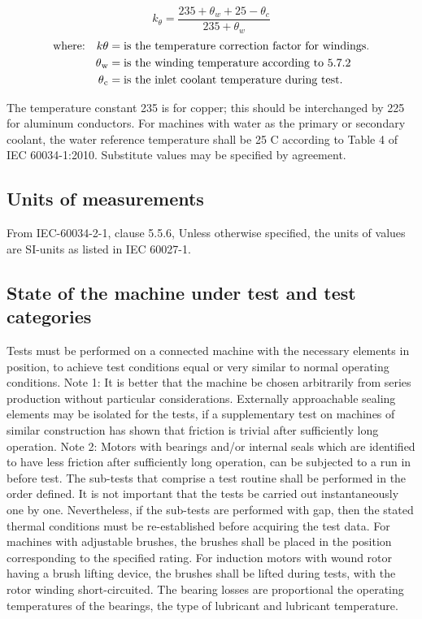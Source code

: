 \begin{equation}
k_{\theta}=\frac{235+\theta_{w}+25-\theta_{c}}{235+\theta_{w}}
\end{equation}
\begin{align*}
\text{where:}\quad
 k\theta    &=  \text{is the temperature correction factor for windings.} \\
 \theta\textsubscript{w}     &=  \text{is the winding temperature according to 5.7.2} 	   \\   
 \theta\textsubscript{c} 	 &=  \text{is the inlet coolant temperature during test.}
\end{align*}

The temperature constant 235 is for copper; this should be interchanged by 225 for aluminum conductors. For machines with water as the primary or secondary coolant, the water reference temperature shall be 25 \degree C according to Table 4 of IEC 60034-1:2010. Substitute values may be specified by agreement.		

\subsection{Units of measurements}
From IEC-60034-2-1, clause 5.5.6, Unless otherwise specified, the units of values are SI-units as listed in IEC 60027-1.

\subsection{State of the machine under test and test categories}
Tests must be performed on a connected machine with the necessary elements in position, to achieve test conditions equal or very similar to normal operating conditions.
Note 1: It is better that the machine be chosen arbitrarily from series production without particular considerations.
Externally approachable sealing elements may be isolated for the tests, if a supplementary test on machines of similar construction has shown that friction is trivial after sufficiently long operation.
Note 2: Motors with bearings and/or internal seals which are identified to have less friction after sufficiently long operation, can be subjected to a run in before test.
The sub-tests that comprise a test routine shall be performed in the order defined. It is not important that the tests be carried out instantaneously one by one. Nevertheless, if the sub-tests are performed with gap, then the stated thermal conditions must be re-established before acquiring the test data.
For machines with adjustable brushes, the brushes shall be placed in the position corresponding to the specified rating. For induction motors with wound rotor having a brush lifting device, the brushes shall be lifted during tests, with the rotor winding short-circuited.
The bearing losses are proportional the operating temperatures of the bearings, the type of lubricant and lubricant temperature.

